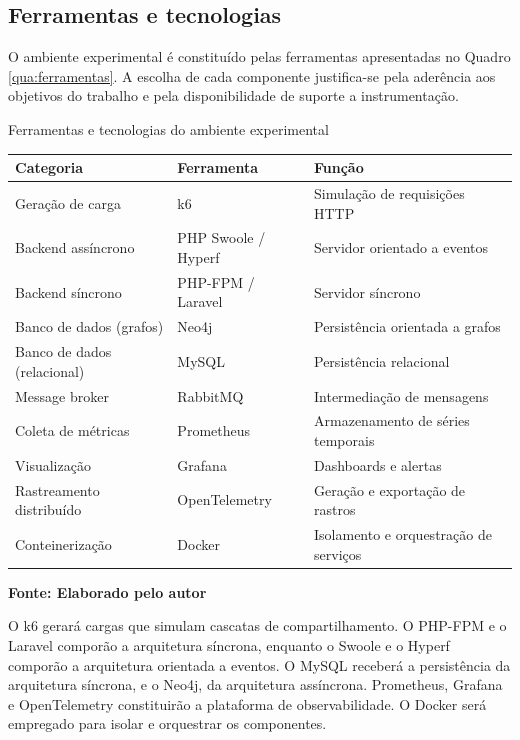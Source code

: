 \estrutura\subsection{\esp Ferramentas e tecnologias}

O ambiente experimental é constituído pelas ferramentas apresentadas no Quadro \ref{qua:ferramentas}. A escolha de cada componente justifica-se pela aderência aos objetivos do trabalho e pela disponibilidade de suporte a instrumentação.

\begin{quadro}[H]
    \centering
    \caption{Ferramentas e tecnologias do ambiente experimental}
    \label{qua:ferramentas}
    \begin{tabular}{|C{3.5cm}|C{5cm}|C{3cm}|}
    \hline
    \textbf{Categoria} & \textbf{Ferramenta} & \textbf{Função} \\ \hline
    Geração de carga & k6 & Simulação de requisições HTTP \\ \hline
    Backend assíncrono & PHP Swoole / Hyperf & Servidor orientado a eventos \\ \hline
    Backend síncrono & PHP-FPM / Laravel & Servidor síncrono \\ \hline
    Banco de dados (grafos) & Neo4j & Persistência orientada a grafos \\ \hline
    Banco de dados (relacional) & MySQL & Persistência relacional \\ \hline
    Message broker & RabbitMQ & Intermediação de mensagens \\ \hline
    Coleta de métricas & Prometheus & Armazenamento de séries temporais \\ \hline
    Visualização & Grafana & Dashboards e alertas \\ \hline
    Rastreamento distribuído & OpenTelemetry & Geração e exportação de rastros \\ \hline
    Conteinerização & Docker & Isolamento e orquestração de serviços \\ \hline
    \end{tabular}
    
    \vspace{0.2cm}
    {\footnotesize \textbf{Fonte: Elaborado pelo autor}}
\end{quadro}

O k6 gerará cargas que simulam cascatas de compartilhamento. O PHP-FPM e o Laravel comporão a arquitetura síncrona, enquanto o Swoole e o Hyperf comporão a arquitetura orientada a eventos. O MySQL receberá a persistência da arquitetura síncrona, e o Neo4j, da arquitetura assíncrona. Prometheus, Grafana e OpenTelemetry constituirão a plataforma de observabilidade. O Docker será empregado para isolar e orquestrar os componentes.

